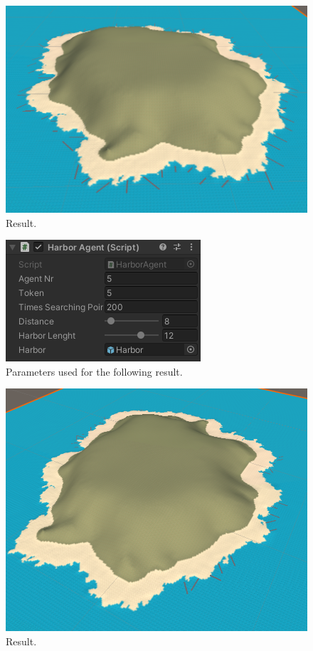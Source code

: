 \documentclass[12pt]{article}
\begin{document}
    \begin{figure}[H]
        \centering
        \includegraphics[scale = 0.3]{images/Harbor agent/1}
        \caption{Result.}
    \end{figure}

    \begin{figure}[H]
        \centering
        \includegraphics[scale = 0.8]{images/Harbor agent/Parameters 2}
        \caption{Parameters used for the following result.}
    \end{figure}

    \begin{figure}[H]
        \centering
        \includegraphics[scale = 0.3]{images/Harbor agent/2}
        \caption{Result.}
    \end{figure}
\end{document}
